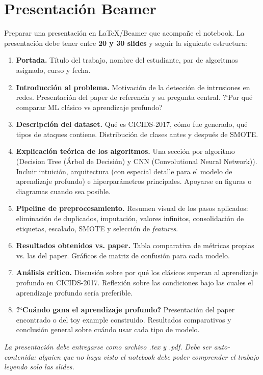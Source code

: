 \documentclass[11pt,a4paper]{article}
\begin{document}
\section{Presentaci\'on Beamer}
Preparar una presentaci\'on en LaTeX/Beamer que acompa\~ne el notebook. La presentaci\'on debe tener entre \textbf{20 y 30 slides} y seguir la siguiente estructura:
\begin{enumerate}[leftmargin=2em,itemsep=3pt]
    \item \textbf{Portada.} T\'itulo del trabajo, nombre del estudiante, par de algoritmos asignado, curso y fecha.
    \item \textbf{Introducci\'on al problema.} Motivaci\'on de la detecci\'on de intrusiones en redes. Presentaci\'on del paper de referencia y su pregunta central. ?`Por qu\'e comparar ML cl\'asico vs aprendizaje profundo?
    \item \textbf{Descripci\'on del dataset.} Qu\'e es CICIDS-2017, c\'omo fue generado, qu\'e tipos de ataques contiene. Distribuci\'on de clases antes y despu\'es de SMOTE.
    \item \textbf{Explicaci\'on te\'orica de los algoritmos.} Una secci\'on por algoritmo (Decision Tree (Árbol de Decisión) y CNN (Convolutional Neural Network)). Incluir intuici\'on, arquitectura (con especial detalle para el modelo de aprendizaje profundo) e hiperpar\'ametros principales. Apoyarse en figuras o diagramas cuando sea posible.
    \item \textbf{Pipeline de preprocesamiento.} Resumen visual de los pasos aplicados: eliminaci\'on de duplicados, imputaci\'on, valores infinitos, consolidaci\'on de etiquetas, escalado, SMOTE y selecci\'on de \textit{features}.
    \item \textbf{Resultados obtenidos vs. paper.} Tabla comparativa de m\'etricas propias vs. las del paper. Gr\'aficos de matriz de confusi\'on para cada modelo.
    \item \textbf{An\'alisis cr\'itico.} Discusi\'on sobre por qu\'e los cl\'asicos superan al aprendizaje profundo en CICIDS-2017. Reflexi\'on sobre las condiciones bajo las cuales el aprendizaje profundo ser\'ia preferible.
    \item \textbf{?`Cu\'ando gana el aprendizaje profundo?} Presentaci\'on del paper encontrado o del toy example construido. Resultados comparativos y conclusi\'on general sobre cu\'ando usar cada tipo de modelo.
\end{enumerate}
\textit{La presentaci\'on debe entregarse como archivo .tex y .pdf. Debe ser auto-contenida: alguien que no haya visto el notebook debe poder comprender el trabajo leyendo solo las slides.}
\end{document}
